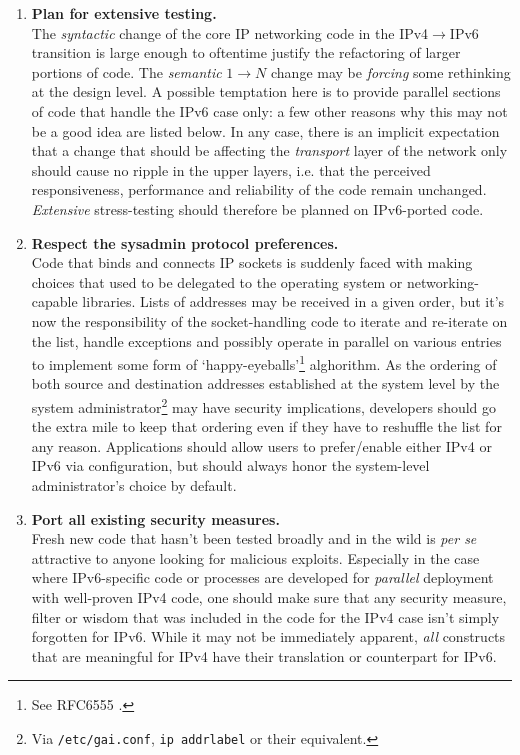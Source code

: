 \begin{enumerate}
\item {\bf Plan for extensive testing.}\\
      The {\it syntactic} change of the core IP networking code in the
      IPv4$\rightarrow$IPv6 transition is large enough to oftentime
      justify the refactoring of larger portions of code. The 
      {\it semantic} $1\rightarrow N$ change may be {\it forcing}
      some rethinking at the design level. A possible temptation here
      is to provide parallel sections of code that handle the IPv6 case
      only: a few other reasons why this may not be a good idea are
      listed below. In any case, there is an implicit expectation that 
      a change that should be affecting the {\it transport} layer of
      the network only should cause no ripple in the upper layers, i.e.
      that the perceived responsiveness, performance and reliability
      of the code remain unchanged. {\it Extensive} stress-testing should
      therefore be planned on IPv6-ported code. 
\item {\bf Respect the sysadmin protocol preferences.}\\
      Code that binds and connects IP sockets is suddenly faced with 
      making choices that used to be delegated to the operating system or
      networking-capable libraries. Lists of addresses may be received in
      a given order, but it's now the responsibility of the socket-handling
      code to iterate and re-iterate on the list, handle exceptions and
      possibly operate in parallel on various entries
      to implement some form of `happy-eyeballs'\footnote{See RFC6555 \cite{rfc}.}
      alghorithm. As the ordering of both source and destination addresses
      established at the system level by the system
      administrator\footnote{Via {\tt /etc/gai.conf}, {\tt ip addrlabel} or their equivalent.}
      may have security implications, developers should go the extra mile to 
      keep that ordering even if they have to reshuffle the list for any reason.
      Applications should allow users to prefer/enable either IPv4 or IPv6 via
      configuration, but should always honor the system-level administrator's choice 
      by default.
\item {\bf Port all existing security measures.}\\
      Fresh new code that hasn't been tested broadly and in the 
      wild is {\it per se} attractive to anyone looking for
      malicious exploits. Especially in the case where IPv6-specific
      code or processes are developed for {\it parallel} deployment with
      well-proven IPv4 code, one should make sure that any security measure,
      filter or wisdom that was included in the code for the IPv4 case isn't
      simply forgotten for IPv6. While it may not be immediately apparent,
      {\it all} constructs that are meaningful for IPv4 have their
      translation or counterpart for IPv6.
\end{enumerate}
